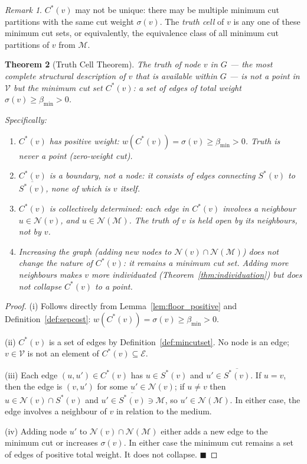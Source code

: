 \documentclass[11pt,twocolumn,a4paper]{article}
\theoremstyle{plain}
\newtheorem{theorem}{Theorem}[section]
\theoremstyle{definition}
\theoremstyle{remark}
\newtheorem{remark}[theorem]{Remark}
\newcommand{\med}{\mathcal{M}}
\newcommand{\Nbd}{\mathcal{N}}
\newcommand{\Ecal}{\mathcal{E}}
\newcommand{\Vcal}{\mathcal{V}}
\newcommand{\bmin}{\beta_{\min}}
\renewcommand{\qed}{\hfill$\blacksquare$}
\begin{document}
\begin{remark}
$C^*(v)$ may not be unique: there may be multiple minimum cut partitions
with the same cut weight $\sigma(v)$. The \emph{truth cell} of $v$ is any
one of these minimum cut sets, or equivalently, the equivalence class of all
minimum cut partitions of $v$ from $\med$.
\end{remark}

\begin{theorem}[Truth Cell Theorem]
\label{thm:truth_cell}
The truth of node $v$ in $G$ --- the most complete structural description of
$v$ that is available within $G$ --- is not a point in $\Vcal$ but the
minimum cut set $C^*(v)$: a set of edges of total weight $\sigma(v) \geq
\bmin > 0$.

Specifically:
\begin{enumerate}[label=(\roman*)]
  \item $C^*(v)$ has positive weight: $w(C^*(v)) = \sigma(v) \geq \bmin > 0$.
  Truth is never a point (zero-weight cut).

  \item $C^*(v)$ is a boundary, not a node: it consists of edges
  connecting $S^*(v)$ to $\overline{S^*(v)}$, none of which is $v$ itself.

  \item $C^*(v)$ is collectively determined: each edge in $C^*(v)$ involves
  a neighbour $u \in \Nbd(v)$, and $u \in \Nbd(\med)$. The truth of $v$
  is held open by its neighbours, not by $v$.

  \item Increasing the graph (adding new nodes to $\Nbd(v) \cap \Nbd(\med)$)
  does not change the nature of $C^*(v)$: it remains a minimum cut set.
  Adding more neighbours makes $v$ more individuated (Theorem~\ref{thm:individuation})
  but does not collapse $C^*(v)$ to a point.
\end{enumerate}
\end{theorem}

\begin{proof}
(i) Follows directly from Lemma~\ref{lem:floor_positive} and
Definition~\ref{def:sepcost}: $w(C^*(v)) = \sigma(v) \geq \bmin > 0$.

(ii) $C^*(v)$ is a set of edges by Definition~\ref{def:mincutset}. No node
is an edge; $v \in \Vcal$ is not an element of $C^*(v) \subseteq \Ecal$.

(iii) Each edge $(u, u') \in C^*(v)$ has $u \in S^*(v)$ and $u' \in
\overline{S^*(v)}$. If $u = v$, then the edge is $(v, u')$ for some
$u' \in \Nbd(v)$; if $u \neq v$ then $u \in \Nbd(v) \cap S^*(v)$ and
$u' \in \overline{S^*(v)} \ni \med$, so $u' \in \Nbd(\med)$. In either
case, the edge involves a neighbour of $v$ in relation to the medium.

(iv) Adding node $u'$ to $\Nbd(v) \cap \Nbd(\med)$ either adds a new
edge to the minimum cut or increases $\sigma(v)$. In either case the minimum
cut remains a set of edges of positive total weight. It does not collapse. \qed
\end{proof}
\end{document}
